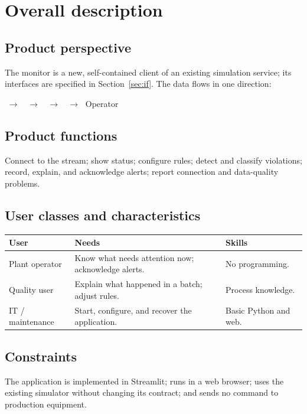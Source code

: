 \documentclass[10pt,a4paper]{article}
\newcommand{\head}[1]{\textbf{\color{courseblue}#1}}
\begin{document}
\section{Overall description}
\subsection{Product perspective}
The monitor is a new, self-contained client of an existing simulation service; its interfaces are specified in Section~\ref{sec:if}. The data flows in one direction:
\begin{center}
 $\;\rightarrow\;$  $\;\rightarrow\;$  $\;\rightarrow\;$  $\;\rightarrow\;$ Operator
\end{center}

\subsection{Product functions}
Connect to the stream; show status; configure rules; detect and classify violations; record, explain, and acknowledge alerts; report connection and data-quality problems.

\subsection{User classes and characteristics}
\begin{tabular}{@{}L{38mm}L{72mm}L{45mm}@{}}
\toprule \head{User} & \head{Needs} & \head{Skills}\\ \midrule
Plant operator & Know what needs attention now; acknowledge alerts. & No programming.\\
Quality user & Explain what happened in a batch; adjust rules. & Process knowledge.\\
IT / maintenance & Start, configure, and recover the application. & Basic Python and web.\\
\bottomrule
\end{tabular}

\subsection{Constraints}
The application is implemented in Streamlit; runs in a web browser; uses the existing simulator without changing its contract; and sends no command to production equipment.
\end{document}
